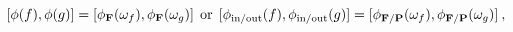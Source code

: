 \begin{equation}
\mbox{$[$}\phi(f),\phi(g)\mbox{$]$} = \mbox{$[$}\phi_{\bf F}(\omega_f),\phi_{\bf F}(\omega_g)\mbox{$]$} \:\: \mbox{or}\:\:
\mbox{$[$}\phi_{\mbox{\scriptsize in/out}}(f),\phi_{\mbox{\scriptsize in/out}}(g)\mbox{$]$} = 
\mbox{$[$}\phi_{{\bf F}/{\bf P}}(\omega_f),\phi_{{\bf F}/{\bf P}}(\omega_g)\mbox{$]$}
\label{UNO}\:,
\end{equation}


